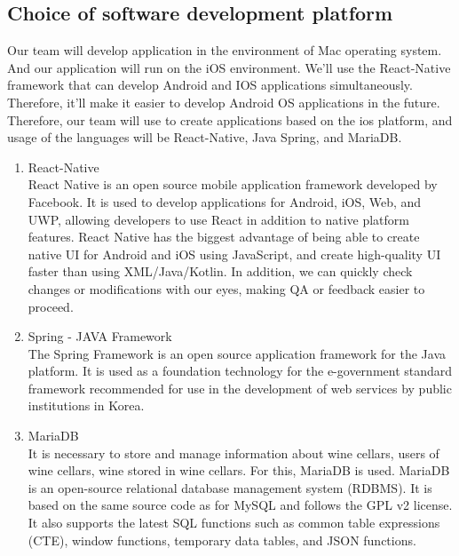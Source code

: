 \documentclass[conference]{IEEEtran}
\numberwithin{figure}{subsection}
\begin{document}
\subsection{Choice of software development platform}
Our team will develop application in the environment of Mac operating system. And our application will run on the iOS environment. We'll use the React-Native framework that can develop Android and IOS applications simultaneously. Therefore, it'll make it easier to develop Android OS applications in the future. Therefore, our team will use to create applications based on the ios platform, and usage of the languages will be React-Native, Java Spring, and MariaDB.
\begin{enumerate}
    \item React-Native\\
    React Native is an open source mobile application framework developed by Facebook. It is used to develop applications for Android, iOS, Web, and UWP, allowing developers to use React in addition to native platform features. React Native has the biggest advantage of being able to create native UI for Android and iOS using JavaScript, and create high-quality UI faster than using XML/Java/Kotlin. In addition, we can quickly check changes or modifications with our eyes, making QA or feedback easier to proceed. 
    \item Spring - JAVA Framework\\
    The Spring Framework is an open source application framework for the Java platform. It is used as a foundation technology for the e-government standard framework recommended for use in the development of web services by public institutions in Korea.
    \item MariaDB\\
    It is necessary to store and manage information about wine cellars, users of wine cellars, wine stored in wine cellars. For this, MariaDB is used. MariaDB is an open-source relational database management system (RDBMS). It is based on the same source code as for MySQL and follows the GPL v2 license. It also supports the latest SQL functions such as common table expressions (CTE), window functions, temporary data tables, and JSON functions.
\end{enumerate}
\end{document}
